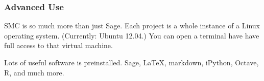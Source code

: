 \documentclass{beamer}
\begin{document}
\begin{frame}
\frametitle{Advanced Use}

\begin{block}{SMC is so much more than just Sage.}
    Each project is a whole instance of a Linux operating system.
    (Currently: Ubuntu 12.04.)
    You can open a terminal have have full access to that virtual machine.
\end{block}

\begin{block}{Lots of useful software is preinstalled.}
    Sage, LaTeX, markdown, iPython, Octave, R, and much more.
\end{block}
\end{frame}
\end{document}
